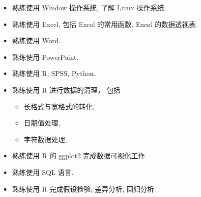 \begin{itemize}
\item 熟练使用 Window 操作系统, 了解 Linux 操作系统.
\item 熟练使用 Excel, 包括 Excel 的常用函数, Excel 的数据透视表.
\item 熟练使用 Word.
\item 熟练使用 PowerPoint.
\item 熟练使用 R, SPSS, Python.
\item 熟练使用 R 进行数据的清理， 包括
\begin{itemize}
\item 长格式与宽格式的转化,
\item 日期值处理,
\item 字符数据处理,
\end{itemize}
\item 熟练使用 R 的 ggplot2 完成数据可视化工作.
\item 熟练使用 SQL 语言.
\item 熟练使用 R 完成假设检验, 差异分析, 回归分析.
\end{itemize}
